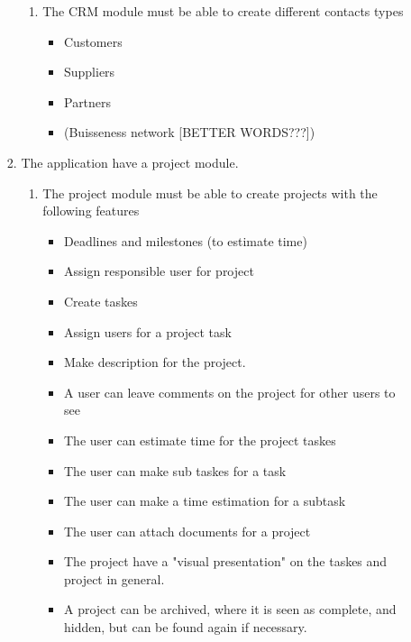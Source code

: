 \begin{enumerate}
\begin{enumerate}
\begin{enumerate}
            \begin{enumerate}
                \item The CRM module must be able to create different contacts types
                \begin{itemize}
                    \item Customers
                    \item Suppliers
                    \item Partners
                    \item (Buisseness network [BETTER WORDS???])
                \end{itemize}
            \end{enumerate}
            \item The application have a project module.
            \begin{enumerate}
                \item The project module must be able to create projects with the following features
                \begin{itemize}
                    \item Deadlines and milestones (to estimate time)
                    \item Assign responsible user for project
                    \item Create taskes
                    \item Assign users for a project task
                    \item Make description for the project.
                    \item A user can leave comments on the project for other users to see
                    \item The user can estimate time for the project taskes
                    \item The user can make sub taskes for a task
                    \item The user can make a time estimation for a subtask
                    \item The user can attach documents for a project
                    \item The project have a "visual presentation" on the taskes and project in general.
                    \item A project can be archived, where it is seen as complete, and hidden, but can be found again if necessary.
                \end{itemize}
            \end{enumerate}

\end{enumerate}
\end{enumerate}
\end{enumerate}
